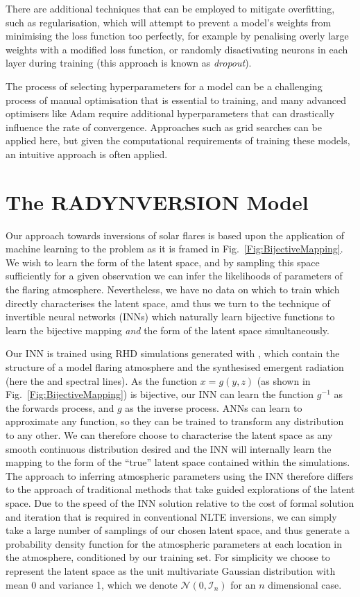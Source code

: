 There are additional techniques that can be employed to mitigate overfitting, such as regularisation, which will attempt to prevent a model's weights from minimising the loss function too perfectly, for example by penalising overly large weights with a modified loss function, or randomly disactivating neurons in each layer during training (this approach is known as \emph{dropout}).

The process of selecting hyperparameters for a model can be a challenging process of manual optimisation that is essential to training, and many advanced optimisers like Adam require additional hyperparameters that can drastically influence the rate of convergence.
Approaches such as grid searches can be applied here, but given the computational requirements of training these models, an intuitive approach is often applied.

\section{The RADYNVERSION Model}\label{Sec:RadynversionModel}

Our approach towards inversions of solar flares is based upon the application of machine learning to the problem as it is framed in Fig.~\ref{Fig:BijectiveMapping}.
We wish to learn the form of the latent space, and by sampling this space sufficiently for a given observation we can infer the likelihoods of parameters of the flaring atmosphere.
Nevertheless, we have no data on which to train which directly characterises the latent space, amd thus we turn to the technique of invertible neural networks (INNs) which naturally learn bijective functions to learn the bijective mapping \emph{and} the form of the latent space simultaneously.

Our INN is trained using RHD simulations generated with \Radyn{}, which contain the structure of a model flaring atmosphere and the synthesised emergent radiation (here the \Ha{} and \CaLine{} spectral lines).
As the function $x = g(y, z)$ (as shown in Fig.~\ref{Fig:BijectiveMapping}) is bijective, our INN can learn the function $g^{-1}$ as the forwards process, and $g$ as the inverse process.
ANNs can learn to approximate any function, so they can be trained to transform any distribution to any other.
We can therefore choose to characterise the latent space as any smooth continuous distribution desired and the INN will internally learn the mapping to the form of the ``true'' latent space contained within the simulations.
The approach to inferring atmospheric parameters using the INN therefore differs to the approach of traditional methods that take guided explorations of the latent space.
Due to the speed of the INN solution relative to the cost of formal solution and iteration that is required in conventional NLTE inversions, we can simply take a large number of samplings of our chosen latent space, and thus generate a probability density function for the atmospheric parameters at each location in the atmosphere, conditioned by our training set.
For simplicity we choose to represent the latent space as the unit multivariate Gaussian distribution with mean 0 and variance 1, which we denote $\mathcal{N}(0, \mathcal{I}_n)$ for an $n$ dimensional case.

